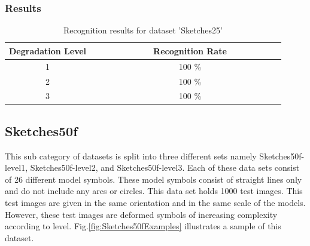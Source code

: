 \subsubsection{Results}
\begin{table}[H]
\centering
\caption{Recognition results for dataset 'Sketches25'}
\begin{tabular}{ccccccccccccccc}
  \hline
      Degradation Level & & & & & & & & Recognition Rate \\
  \hline
     1 & & & & & & & &  100 \% \\
     2 & & & & & & & &  100 \% \\
     3 & & & & & & & &  100 \% \\
  \hline
\end{tabular}
\end{table}

\vspace{49.3mm}

\subsection{Sketches50f}
This sub category of datasets is split into three different sets namely Sketches50f-level1, Sketches50f-level2, and Sketches50f-level3. Each of these data sets consist of 26 different model symbols. These model symbols consist of straight lines only and do not include any arcs or circles. This data set holds 1000 test images. This test images are given in the same orientation and in the same scale of the models. However, these test images are deformed symbols of increasing complexity according to level. Fig.\ref{fig:Sketches50fExamples} illustrates a sample of this dataset.

